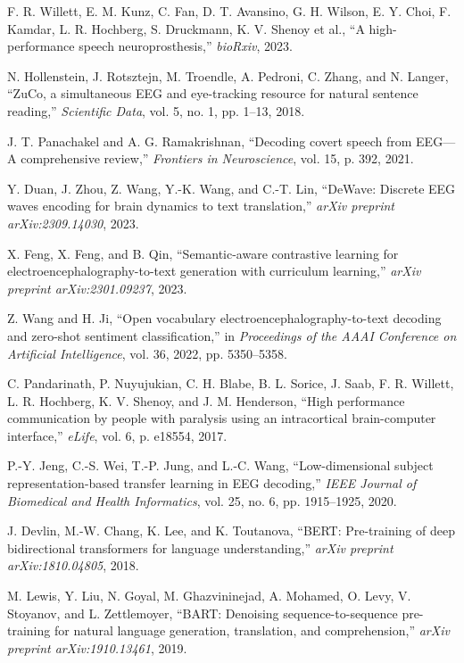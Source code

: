 \documentclass[journal]{IEEEtran}
\begin{document}
\begin{thebibliography}{1}
	F. R. Willett, E. M. Kunz, C. Fan, D. T. Avansino, G. H. Wilson, E. Y. Choi, F. Kamdar, L. R. Hochberg, S. Druckmann, K. V. Shenoy et al., ``A high-performance speech neuroprosthesis,'' \textit{bioRxiv}, 2023.
	
	N. Hollenstein, J. Rotsztejn, M. Troendle, A. Pedroni, C. Zhang, and N. Langer, ``ZuCo, a simultaneous EEG and eye-tracking resource for natural sentence reading,'' \textit{Scientific Data}, vol. 5, no. 1, pp. 1–13, 2018.
	
	J. T. Panachakel and A. G. Ramakrishnan, ``Decoding covert speech from EEG—A comprehensive review,'' \textit{Frontiers in Neuroscience}, vol. 15, p. 392, 2021.
	
	Y. Duan, J. Zhou, Z. Wang, Y.-K. Wang, and C.-T. Lin, ``DeWave: Discrete EEG waves encoding for brain dynamics to text translation,'' \textit{arXiv preprint arXiv:2309.14030}, 2023.
	
	X. Feng, X. Feng, and B. Qin, ``Semantic-aware contrastive learning for electroencephalography-to-text generation with curriculum learning,'' \textit{arXiv preprint arXiv:2301.09237}, 2023.
	
	Z. Wang and H. Ji, ``Open vocabulary electroencephalography-to-text decoding and zero-shot sentiment classification,'' in \textit{Proceedings of the AAAI Conference on Artificial Intelligence}, vol. 36, 2022, pp. 5350–5358.
	
	C. Pandarinath, P. Nuyujukian, C. H. Blabe, B. L. Sorice, J. Saab, F. R. Willett, L. R. Hochberg, K. V. Shenoy, and J. M. Henderson, ``High performance communication by people with paralysis using an intracortical brain-computer interface,'' \textit{eLife}, vol. 6, p. e18554, 2017.
	
	P.-Y. Jeng, C.-S. Wei, T.-P. Jung, and L.-C. Wang, ``Low-dimensional subject representation-based transfer learning in EEG decoding,'' \textit{IEEE Journal of Biomedical and Health Informatics}, vol. 25, no. 6, pp. 1915–1925, 2020.
	
	J. Devlin, M.-W. Chang, K. Lee, and K. Toutanova, ``BERT: Pre-training of deep bidirectional transformers for language understanding,'' \textit{arXiv preprint arXiv:1810.04805}, 2018.
	
	M. Lewis, Y. Liu, N. Goyal, M. Ghazvininejad, A. Mohamed, O. Levy, V. Stoyanov, and L. Zettlemoyer, ``BART: Denoising sequence-to-sequence pre-training for natural language generation, translation, and comprehension,'' \textit{arXiv preprint arXiv:1910.13461}, 2019.
	

\end{thebibliography}
\end{document}
